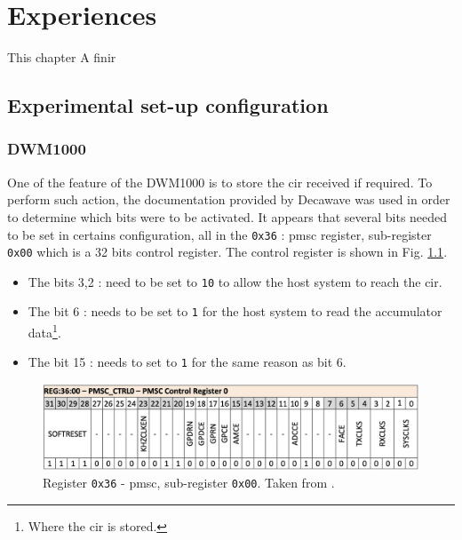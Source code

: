 \chapter{Experiences}

This chapter \color{red} A finir \color{black}

\section{Experimental set-up configuration}

\subsection{DWM1000}

One of the feature of the DWM1000 is to store the \gls{cir} received if required. To perform such action, the documentation provided by Decawave \cite{usermanual} was used in order to determine which bits were to be activated. It appears that several bits needed to be set in certains configuration, all in the \texttt{0x36} : \gls{pmsc} register, sub-register \texttt{0x00} which is a 32 bits control register. The control register is shown in Fig. \ref{fig:control_reg}.
\vspace{2mm}

\begin{itemize}
\item The bits 3,2 :    need to be set to \texttt{10} to allow the host system to reach the \gls{cir}.
\item The bit 6 :  needs to be set to \texttt{1} for the host system to read the accumulator data\footnote{Where the \gls{cir} is stored.}.
\item The bit 15 :  needs to set to \texttt{1} for the same reason as bit 6.
\end{itemize}

\begin{figure}[H]
\centering
\includegraphics[width=.9\linewidth]{Images/control_ref.png}
\caption{Register \texttt{0x36} - \gls{pmsc}, sub-register \texttt{0x00}. Taken from \cite{usermanual}. \label{fig:control_reg}}
\end{figure}


